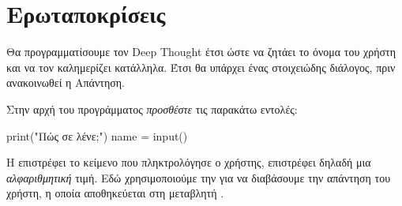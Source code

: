 \documentclass[a4paper,11pt,oneside]{book}
\begin{document}
\vspace{-6\parskip} 
\section{Ερωταποκρίσεις}

Θα προγραμματίσουμε τον Deep Thought έτσι ώστε να ζητάει το όνομα του χρήστη και να τον καλημερίζει κατάλληλα. Έτσι θα υπάρχει ένας στοιχειώδης διάλογος, πριν ανακοινωθεί η Απάντηση.

\begin{step}
\label{step:input}

Στην αρχή του προγράμματος \emph{προσθέστε} τις παρακάτω εντολές:

\begin{pynew}
print("Πώς σε λένε;")
name = input()
\end{pynew}

Η  επιστρέφει το κείμενο που πληκτρολόγησε ο χρήστης,
επιστρέφει δηλαδή μια \emph{αλφαριθμητική} τιμή. Εδώ χρησιμοποιούμε την
 για να διαβάσουμε την απάντηση του χρήστη, η οποία αποθηκεύεται στη μεταβλητή .
\end{step}
\end{document}
